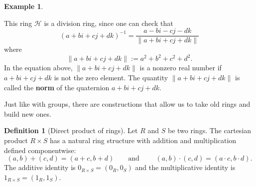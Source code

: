 \documentclass[12pt]{report}
\numberwithin{equation}{section}
\numberwithin{theorem}{chapter}
\theoremstyle{definition}
\newtheorem{definition}[theorem]{Definition}
\newtheorem{example}[theorem]{Example}
\newtheorem*{basic properties}{Basic Properties}
\newtheorem*{Important Remark}{Important Remark}
\newcommand{\df}[1]{{\bf #1}\index{#1}}
\DeclareMathOperator{\Fun}{Fun}
\newcommand{\R}{\mathbb{R}}
\newcommand{\C}{\mathbb{C}}
\DeclareMathOperator{\Mat}{Mat}
\begin{document}
\begin{example}
\begin{enumerate}[itemsep=0.2em,leftmargin=20pt]
This ring $\mathcal{H}$ is a division ring, since one can check that
$$(a + bi + cj + dk)^{-1} = \frac{a -  bi -  cj - dk}{\|a + bi + cj + dk\|}$$
where
$$\|a + bi + cj + dk \| := a^2 + b^2 + c^2 + d^2.$$
In the equation above, $\|a + bi + cj + dk \|$ is a nonzero real number if $a + bi + cj + dk$ is not the zero element. The quantity $\|a + bi + cj + dk \|$ is called the \df{norm} of the quaternion $a + bi + cj + dk$.




\end{enumerate}
\end{example}


Just like with groups, there are constructions that allow us to take old rings and build new ones.


\begin{definition}[Direct product of rings]
Let $R$ and $S$ be two rings.
The cartesian product $R\times S$ has a natural ring structure with addition and multiplication defined componentwise:
$$(a,b)+(c,d)=(a+c,b+d) \qquad \text{and } \qquad (a,b)\cdot(c,d)=(a\cdot c,b\cdot d).$$
The additive identity is $0_{R \times S} = (0_R, 0_{S})$ and the multiplicative identity is $1_{R \times S} = (1_R, 1_{S})$.
\end{definition}
\end{document}
